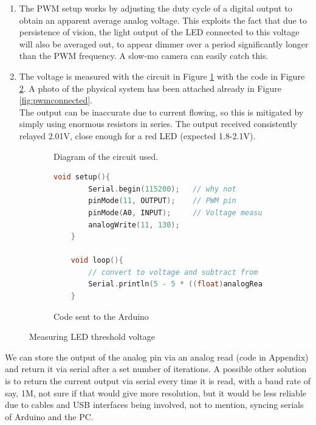 \begin{arabicparts}
    \begin{enumerate}
        \item The PWM setup works by adjusting the duty cycle of a digital output to
        obtain an apparent average analog voltage. This exploits the fact that due to
        persistence of vision, the light output of the LED connected to this voltage
        will also be averaged out, to appear dimmer over a period significantly longer
        than the PWM frequency. A slow-mo camera can easily catch this.
        \item The voltage is measured with the circuit in Figure \ref{subfig:pwmledcirc} with 
        the code in Figure \ref{subfig:pwmledcode}. A photo of the physical system has been 
        attached already in Figure \ref{fig:pwmconnected}. \\
        The output can be inaccurate due to current flowing, so this is mitigated by simply
        using enormous resistors in series. The output received consistently relayed 2.01V,
        close enough for a red LED (expected 1.8-2.1V).
    \end{enumerate}

    \begin{figure}[ht]
        \centering
        \begin{subfigure}[b]{0.3\textwidth}
            \scalebox{0.9}{}
            \caption{Diagram of the circuit used.}
            \label{subfig:pwmledcirc}            
        \end{subfigure}
        \begin{subfigure}[b]{0.8\textwidth}
            \begin{lstlisting}[language=C++]
    void setup(){
        Serial.begin(115200);   // why not
        pinMode(11, OUTPUT);    // PWM pin
        pinMode(A0, INPUT);     // Voltage measuring pin
        analogWrite(11, 130);
    }

    void loop(){
        // convert to voltage and subtract from Vcc to get the drop
        Serial.println(5 - 5 * ((float)analogRead(A0) / (float) 1023));
    }
            \end{lstlisting}
            \caption{Code sent to the Arduino}
            \label{subfig:pwmledcode}            
        \end{subfigure}
        \caption{Measuring LED threshold voltage}
        \label{fig:pwmled}
    \end{figure}

    \questionpart
    We can store the output of the analog pin via an analog read (code in Appendix) and
    return it via serial after a set number of iterations. A possible other solution is 
    to return the current output via serial every time it is read, with a baud rate of say, 1M,
    not sure if that would give more resolution, but it would be less reliable due to cables and 
    USB interfaces being involved, not to mention, syncing serials of Arduino and the PC. 


\end{arabicparts}
